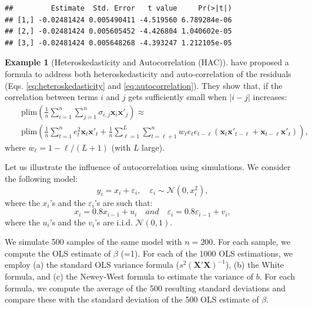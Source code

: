 \documentclass[
  12pt,
]{book}
\theoremstyle{definition}
\theoremstyle{definition}
\newtheorem{example}{Example}[chapter]
\theoremstyle{definition}
\theoremstyle{definition}
\theoremstyle{remark}
\begin{document}
\begin{verbatim}
##         Estimate  Std. Error   t value     Pr(>|t|)
## [1,] -0.02481424 0.005490411 -4.519560 6.789284e-06
## [2,] -0.02481424 0.005605452 -4.426804 1.040602e-05
## [3,] -0.02481424 0.005648268 -4.393247 1.212105e-05
\end{verbatim}

\begin{example}[Heteroskedasticity and Autocorrelation (HAC)]
\protect\hypertarget{exm:HCheterAC}{}\label{exm:HCheterAC}\citet{Newey_West_1987} have proposed a formula to address both heteroskedasticity and auto-correlation of the residuals (Eqs. \eqref{eq:heteroskedasticity} and \eqref{eq:autocorrelation}). They show that, if the correlation between terms \(i\) and \(j\) gets sufficiently small when \(|i-j|\) increases:
\begin{eqnarray}
&&\mbox{plim} \left( \frac{1}{n}\sum_{i=1}^{n}\sum_{j=1}^{n}\sigma_{i,j}\mathbf{x}_i\mathbf{x}'_j \right) \approx  \\
&&\mbox{plim} \left( \frac{1}{n}\sum_{t=1}^{n}e_{t}^2\mathbf{x}_t\mathbf{x}'_t +
\frac{1}{n}\sum_{\ell=1}^{L}\sum_{t=\ell+1}^{n}w_\ell e_{t}e_{t-\ell}(\mathbf{x}_t\mathbf{x}'_{t-\ell} + \mathbf{x}_{t-\ell}\mathbf{x}'_{t})
\right), \nonumber \label{eq:NW}
\end{eqnarray}
where \(w_\ell = 1 - \ell/(L+1)\) (with \(L\) large).

Let us illustrate the influence of autocorrelation using simulations. We consider the following model:
\begin{equation}
y_i = x_i + \varepsilon_i, \quad \varepsilon_i \sim \mathcal{N}(0,x_i^2),\label{eq:simul11}
\end{equation}
where the \(x_i\)'s and the \(\varepsilon_i\)'s are such that:
\begin{equation}
x_i = 0.8 x_{i-1} + u_i \quad and \quad \varepsilon_i = 0.8 \varepsilon_{i-1} + v_i, \label{eq:simul22}
\end{equation}
where the \(u_i\)'s and the \(v_i\)'s are i.i.d. \(\mathcal{N}(0,1)\).

We simulate 500 samples of the same model with \(n=200\). For each sample, we compute the OLS estimate of \(\beta\) (=1). For each of the 1000 OLS estimations, we employ (a) the standard OLS variance formula (\(s^2 (\mathbf{X}'\mathbf{X})^{-1}\)), (b) the White formula, and (c) the Newey-West formula to estimate the variance of \(b\). For each formula, we compute the average of the 500 resulting standard deviations and compare these with the standard deviation of the 500 OLS estimate of \(\beta\).


\end{example}
\end{document}

